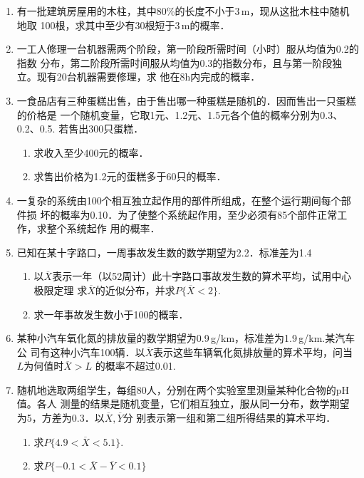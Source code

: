 \documentclass[10pt,a4paper]{article}
\begin{document}
\begin{enumerate}
    \item 有一批建筑房屋用的木柱，其中80\%的长度不小于3$\, $m，现从这批木柱中随机地取
    100根，求其中至少有30根短于3$\, $m的概率．


    \item 一工人修理一台机器需两个阶段，第一阶段所需时间（小时）服从均值为0.2的指数
    分布，第二阶段所需时间服从均值为0.3的指数分布，且与第一阶段独立。现有20台机器需要修理，求
    他在8h内完成的概率．


    \item 一食品店有三种蛋糕出售，由于售出哪一种蛋糕是随机的．因而售出一只蛋糕的价格是
    一个随机变量，它取1元、1.2元、1.5元各个值的概率分别为0.3、0.2、0.5. 若售出300只蛋糕．
    \begin{enumerate}
        \item 求收入至少400元的概率．
        \item 求售出价格为1.2元的蛋糕多于60只的概率．
    \end{enumerate}



    \item 一复杂的系统由100个相互独立起作用的部件所组成，在整个运行期间每个部件损
    坏的概率为0.10．为了使整个系统起作用，至少必须有85个部件正常工作，求整个系统起作
    用的概率．


    \item 已知在某十字路口，一周事故发生数的数学期望为2.2．标准差为1.4
    \begin{enumerate}
        \item 以$\overline{X}$表示一年（以52周计）此十字路口事故发生数的算术平均，试用中心极限定理
        求$\overline{X}$的近似分布，并求$P\{\overline{X}<2\}$.
        \item 求一年事故发生数小于100的概率．
    \end{enumerate}


    \item 某种小汽车氧化氮的排放量的数学期望为0.9$\, $g/km，标准差为1.9$\, $g/km.某汽车公
    司有这种小汽车100辆．以$\overline{X}$表示这些车辆氧化氮排放量的算术平均，问当$L$为何值时$\overline{X}>L$
    的概率不超过0.01.



    \item 随机地选取两组学生，每组80人，分别在两个实验室里测量某种化合物的pH值。各人
    测量的结果是随机变量，它们相互独立，服从同一分布，数学期望为5，方差为0.3．以$\overline{X},\overline{Y}$分
    别表示第一组和第二组所得结果的算术平均．
    \begin{enumerate}
        \item 求$P\{4.9<\overline{X}<5.1\}$.
        \item 求$P\{-0.1<\overline{X}-\overline{Y}<0.1\}$
    \end{enumerate}




\end{enumerate}
\end{document}
